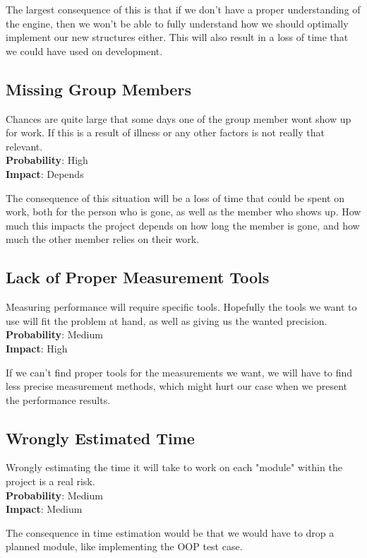 The largest consequence of this is that if we don't have a proper understanding of the engine,
then we won't be able to fully understand how we should optimally implement our new structures either.
This will also result in a loss of time that we could have used on development.

\subsection*{Missing Group Members}
Chances are quite large that some days one of the group member wont show up for work.
If this is a result of illness or any other factors is not really that relevant.\\
\textbf{Probability}: High\\
\textbf{Impact}: Depends

The consequence of this situation will be a loss of time that could be spent on work, 
both for the person who is gone, as well as the member who shows up.
How much this impacts the project depends on how long the member is gone,
and how much the other member relies on their work.

\subsection*{Lack of Proper Measurement Tools}
Measuring performance will require specific tools. 
Hopefully the tools we want to use will fit the problem at hand, 
as well as giving us the wanted precision.\\
\textbf{Probability}: Medium\\
\textbf{Impact}: High

If we can't find proper tools for the measurements we want,
we will have to find less precise measurement methods,
which might hurt our case when we present the performance results.

\subsection*{Wrongly Estimated Time}
Wrongly estimating the time it will take to work on each "module" within the project is a real risk.\\
\textbf{Probability}: Medium\\
\textbf{Impact}: Medium

The consequence in time estimation would be that we would have to drop a planned module,
like implementing the OOP test case.
